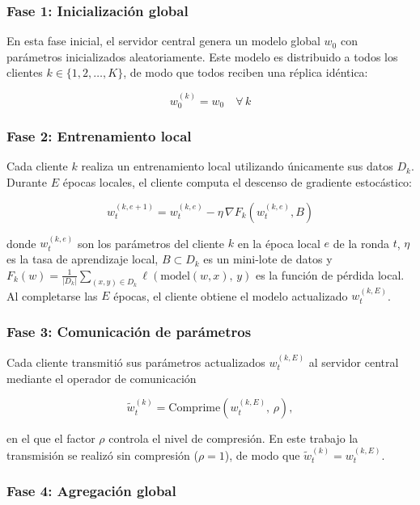 \subsubsection*{Fase 1: Inicialización global}
 
En esta fase inicial, el servidor central genera un modelo global $w_0$ con parámetros
inicializados aleatoriamente. Este modelo es distribuido a todos los clientes
$k \in \{1, 2, \ldots, K\}$, de modo que todos reciben una réplica idéntica:
 
\[
w_0^{(k)} = w_0 \quad \forall\, k
\]
 
\subsubsection*{Fase 2: Entrenamiento local}
 
Cada cliente $k$ realiza un entrenamiento local utilizando únicamente sus datos
$D_k$. Durante $E$ épocas locales, el cliente computa el descenso de gradiente
estocástico:
 
\[
w_t^{(k,e+1)} = w_t^{(k,e)} - \eta \,\nabla F_k\!\left(w_t^{(k,e)}, B\right)
\]
 
donde $w_t^{(k,e)}$ son los parámetros del cliente $k$ en la época local $e$ de la ronda
$t$, $\eta$ es la tasa de aprendizaje local, $B \subset D_k$ es un mini-lote de datos y
$F_k(w) = \frac{1}{|D_k|} \sum_{(x,y) \in D_k} \ell(\mathrm{model}(w, x),\, y)$
es la función de pérdida local. Al completarse las $E$ épocas, el cliente obtiene el modelo
actualizado $w_t^{(k,E)}$.
 
\subsubsection*{Fase 3: Comunicación de parámetros}
 
Cada cliente transmitió sus parámetros actualizados $w_t^{(k,E)}$ al servidor central
mediante el operador de comunicación

\[
\tilde{w}_t^{(k)} = \mathrm{Comprime}\!\left(w_t^{(k,E)},\, \rho\right),
\]

en el que el factor $\rho$ controla el nivel de compresión. En este trabajo la transmisión
se realizó sin compresión ($\rho = 1$), de modo que $\tilde{w}_t^{(k)} = w_t^{(k,E)}$.
 
\subsubsection*{Fase 4: Agregación global}
 
